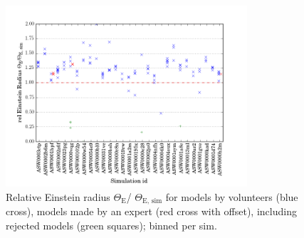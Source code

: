 \documentclass[12pt,preprint]{aastex}
\newcommand{\ERg}[1][]{$\Theta_{\text{E#1}}$\xspace} %
\newcommand{\ERf}[1][]{Einstein radius $\Theta_\text{E#1}$\xspace} %
\begin{document}
\begin{figure}[htbp]
  \centering
    \includegraphics[width=0.80\textwidth]{fig/eR_4.png}
  \caption{Relative \ERf / \ERg[, sim] for models by volunteers (blue cross), models made by an expert (red cross with offset), including rejected models (green squares); binned per sim.}
  \label{fig:ER_per_sim}
\end{figure}
\end{document}
